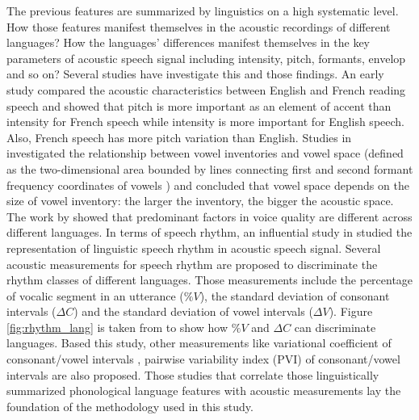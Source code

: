 The previous features are summarized by linguistics on a high systematic level. How those features manifest themselves in the acoustic recordings of different languages? How the languages' differences manifest themselves in the key parameters of acoustic speech signal including intensity, pitch, formants, envelop and so on? Several studies have investigate this and those findings. An early study \citep{parmenter1933experimental} compared the acoustic characteristics between English and French reading speech and showed that pitch is more important as an element of accent than intensity for French speech while intensity is more important for English speech. Also, French speech has more pitch variation than English. Studies in \citep{jongman1989acoustic,bradlow1995comparative,al2005does} investigated the relationship between vowel inventories and vowel space (defined as the two-dimensional area bounded by lines connecting first and second formant frequency coordinates of vowels \citep{fant1973speech}) and concluded that vowel space depends on the size of vowel inventory: the larger the inventory, the bigger the acoustic space. The work by \citep{wagner2003voice} showed that predominant factors in voice quality are different across different languages. In terms of speech rhythm, an influential study in \citep{ramus1999correlates} studied the representation of linguistic speech rhythm in acoustic speech signal. Several acoustic measurements for speech rhythm are proposed to discriminate the rhythm classes of different languages. Those measurements include the percentage of vocalic segment in an utterance ($\%V$), the standard deviation of consonant intervals ($\Delta C$) and the standard deviation of vowel intervals ($\Delta V$). Figure \ref{fig:rhythm_lang} is taken from \citep{ramus1999correlates} to show how $\%V$ and $\Delta C$ can discriminate languages. Based this study, other measurements like variational coefficient of consonant/vowel intervals \citep{dellwo2006rhythm}, pairwise variability index (PVI) of consonant/vowel intervals \citep{grabe2002durational} are also proposed. Those studies that correlate those linguistically summarized phonological language features with acoustic measurements lay the foundation of the methodology used in this study.

